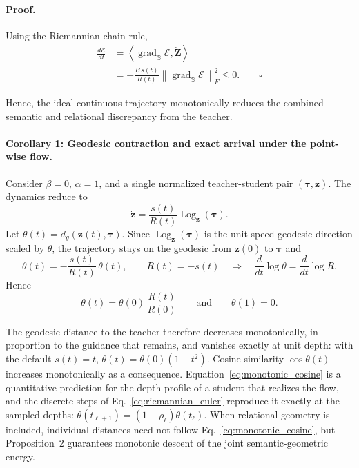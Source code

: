 \documentclass[11pt]{article}
\begin{document}
\paragraph{Proof.}
Using the Riemannian chain rule,
\begin{align}
    \frac{d\mathcal{E}}{dt}
    &=
    \left\langle
        \operatorname{grad}_{\mathbb{S}}\mathcal{E},
        \dot{\mathbf{Z}}
    \right\rangle
    \\
    &=
    -
    \frac{B\,s(t)}{R(t)}
    \left\|
        \operatorname{grad}_{\mathbb{S}}\mathcal{E}
    \right\|_F^2
    \le0.
    \qquad \square
\end{align}

Hence, the ideal continuous trajectory monotonically reduces the combined
semantic and relational discrepancy from the teacher.


\paragraph{Corollary 1: Geodesic contraction and exact arrival under the point-wise flow.}

Consider $\beta=0$, $\alpha=1$, and a single normalized teacher-student pair
$(\boldsymbol{\tau},\mathbf{z})$. The dynamics reduce to
\begin{equation}
    \dot{\mathbf{z}}
    =
    \frac{s(t)}{R(t)}
    \operatorname{Log}_{\mathbf{z}}(\boldsymbol{\tau}).
    \label{eq:anchor_flow}
\end{equation}
Let $\theta(t)=d_g(\mathbf{z}(t),\boldsymbol{\tau})$. Since
$\operatorname{Log}_{\mathbf{z}}(\boldsymbol{\tau})$ is the unit-speed
geodesic direction scaled by $\theta$, the trajectory stays on the geodesic
from $\mathbf{z}(0)$ to $\boldsymbol{\tau}$ and
\begin{equation}
    \dot\theta(t)
    =
    -\frac{s(t)}{R(t)}\,\theta(t),
    \qquad
    \dot R(t)=-s(t)
    \quad\Longrightarrow\quad
    \frac{d}{dt}\log\theta
    =
    \frac{d}{dt}\log R .
\end{equation}
Hence
\begin{equation}
    \boxed{
    \theta(t)
    =
    \theta(0)\,\frac{R(t)}{R(0)}
    }
    \qquad\text{and}\qquad
    \theta(1)=0 .
    \label{eq:monotonic_cosine}
\end{equation}

The geodesic distance to the teacher therefore decreases monotonically,
in proportion to the guidance that remains, and vanishes exactly at unit
depth: with the default $s(t)=t$, $\theta(t)=\theta(0)(1-t^2)$. Cosine
similarity $\cos\theta(t)$ increases monotonically as a consequence.
Equation~\eqref{eq:monotonic_cosine} is a quantitative prediction for the
depth profile of a student that realizes the flow, and the discrete steps
of Eq.~\eqref{eq:riemannian_euler} reproduce it exactly at the sampled
depths: $\theta(t_{\ell+1})=(1-\rho_\ell)\theta(t_\ell)$.
When relational geometry is included, individual distances need not
follow Eq.~\eqref{eq:monotonic_cosine}, but Proposition~2 guarantees
monotonic descent of the joint semantic-geometric energy.
\end{document}

